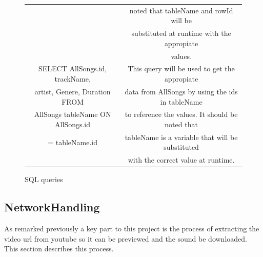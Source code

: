\documentclass{article}
\begin{document}
\begin{figure}[H]
\begin{center}
\begin{tabular} { | c | c | }
                                             &noted that tableName and rowId will be          \\
                                             &substituted at runtime with the appropiate      \\
                                             &values.                                         \\ \hline
            SELECT AllSongs.id, trackName,   &This query will be used to get the appropiate   \\
            artist, Genere, Duration FROM    &data from AllSongs by using the ids in tableName\\
            AllSongs tableName ON AllSongs.id&to reference the values. It should be noted that\\
             = tableName.id                  &tableName is a variable that will be substituted\\
                                             &with the correct value at runtime.              \\ \hline
        \end{tabular}
    \end{center}
    \caption{SQL queries} \label{fig:SQLTable}
\end{figure}

\subsection{NetworkHandling}\label{NetworkHandling}

As remarked previously a key part to this project is the process
of extracting the video url from youtube so it can be previewed
and the sound be downloaded. This section describes this process.
\end{document}
